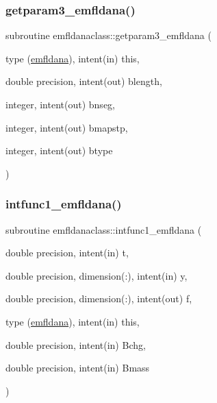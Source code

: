 \mbox{\label{namespaceemfldanaclass_a67575d528d7993efafb802f4c346d6c0}} 
\subsubsection{\texorpdfstring{getparam3\_emfldana()}{getparam3\_emfldana()}}
{\footnotesize\ttfamily subroutine emfldanaclass\+::getparam3\+\_\+emfldana (\begin{DoxyParamCaption}\item[{type (\mbox{\hyperlink{namespaceemfldanaclass_structemfldanaclass_1_1emfldana}{emfldana}}), intent(in)}]{this,  }\item[{double precision, intent(out)}]{blength,  }\item[{integer, intent(out)}]{bnseg,  }\item[{integer, intent(out)}]{bmapstp,  }\item[{integer, intent(out)}]{btype }\end{DoxyParamCaption})}

\mbox{\label{namespaceemfldanaclass_aeab0c2abbaa5f527784ce7006d3b4d58}} 
\subsubsection{\texorpdfstring{intfunc1\_emfldana()}{intfunc1\_emfldana()}}
{\footnotesize\ttfamily subroutine emfldanaclass\+::intfunc1\+\_\+emfldana (\begin{DoxyParamCaption}\item[{double precision, intent(in)}]{t,  }\item[{double precision, dimension(\+:), intent(in)}]{y,  }\item[{double precision, dimension(\+:), intent(out)}]{f,  }\item[{type (\mbox{\hyperlink{namespaceemfldanaclass_structemfldanaclass_1_1emfldana}{emfldana}}), intent(in)}]{this,  }\item[{double precision, intent(in)}]{Bchg,  }\item[{double precision, intent(in)}]{Bmass }\end{DoxyParamCaption})}


